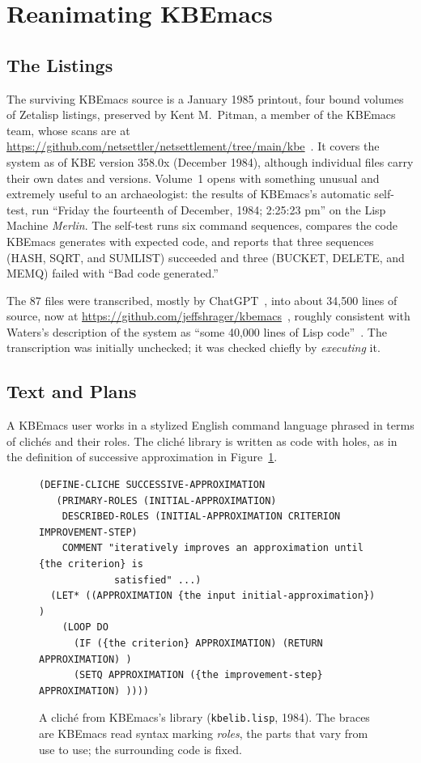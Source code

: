 \documentclass[11pt]{article}
\begin{document}
\section{Reanimating KBEmacs}
\label{sec:kbe}

\subsection{The Listings}

The surviving KBEmacs source is a January 1985 printout, four bound
volumes of Zetalisp listings, preserved by Kent M.~Pitman, a member of the KBEmacs team, whose scans
are at \url{https://github.com/netsettler/netsettlement/tree/main/kbe}~\cite{pitmanscans}. It covers the system as
of KBE version 358.0x (December 1984), although individual files carry
their own dates and versions. Volume~1 opens with something unusual and
extremely useful to an archaeologist: the results of KBEmacs's
automatic self-test, run ``Friday the fourteenth of December, 1984;
2:25:23 pm'' on the Lisp Machine \emph{Merlin}. The self-test runs six
command sequences, compares the code KBEmacs generates with expected
code, and reports that three sequences (HASH, SQRT, and SUMLIST)
succeeded and three (BUCKET, DELETE, and MEMQ) failed with ``Bad code
generated.''

The 87 files were transcribed, mostly by ChatGPT~\cite{chatgpt}, into about 34,500 lines of source, now at \url{https://github.com/jeffshrager/kbemacs}~\cite{kbemacsrepo}, roughly
consistent with Waters's description of the system as ``some 40,000
lines of Lisp code''~\cite[p.~55]{waters1986aimag}. The transcription
was initially unchecked; it was checked chiefly by \emph{executing}
it.

\subsection{Text and Plans}

A KBEmacs user works in a stylized English command language phrased in
terms of clich\'es and their roles. The clich\'e library is written as
code with holes, as in the definition of successive approximation
in Figure~\ref{fig:cliche}.

\begin{figure}[H]
\begin{lstlisting}
(DEFINE-CLICHE SUCCESSIVE-APPROXIMATION
   (PRIMARY-ROLES (INITIAL-APPROXIMATION)
    DESCRIBED-ROLES (INITIAL-APPROXIMATION CRITERION IMPROVEMENT-STEP)
    COMMENT "iteratively improves an approximation until {the criterion} is
             satisfied" ...)
  (LET* ((APPROXIMATION {the input initial-approximation}) )
    (LOOP DO
      (IF ({the criterion} APPROXIMATION) (RETURN APPROXIMATION) )
      (SETQ APPROXIMATION ({the improvement-step} APPROXIMATION) ))))
\end{lstlisting}
\caption{A clich\'e from KBEmacs's library (\texttt{kbelib.lisp}, 1984).
The braces are KBEmacs read syntax marking \emph{roles}, the parts that
vary from use to use; the surrounding code is fixed.}
\label{fig:cliche}
\end{figure}
\end{document}
